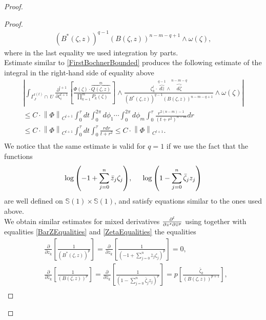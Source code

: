\documentclass[11pt,reqno]{amsart}
\numberwithin{equation}{section}
\begin{document}
\begin{proof}
\begin{proof}
\begin{multline*}
{\left(B^*(\zeta,z)\right)^{q-1}\left(B(\zeta,z)\right)^{n-m-q+1}}
\wedge\omega(\zeta),
\end{multline*}
where in the last equality we used integration by parts.\\
\indent
Estimate similar to \eqref{FirstBochnerBounded} produces the following estimate of the integral
in the right-hand side of equality above
\begin{multline*}
\left|\int_{\Gamma^{\epsilon(t)}_J\cap\ U}
\frac{\partial^{l+1}}{\partial\zeta_i^{l+1}}
\left[\frac{\Phi(\zeta)\cdot\overbrace{Q(\zeta,z)}^{m}}{\prod_{k=1}^mP_k(\zeta)}\right]
\wedge\frac{\zeta_k^l\cdot\overbrace{d{\bar z}}^{q-1}
\wedge\overbrace{d{\bar\zeta}}^{n-m-q}}
{\left(B^*(\zeta,z)\right)^{q-1}\left(B(\zeta,z)\right)^{n-m-q+1}}
\wedge\omega(\zeta)\right|\\
\leq C\cdot\left\|\Phi\right\|_{C^{l+1}}
\int_0^{\tau}dt\int_0^{2\pi} d\phi_1\cdots\int_0^{2\pi} d\phi_m
\int_0^{\tau}\frac{r^{2(n-m)-1}}{\left(t+r^2\right)^{n-m}}dr\\
\leq C\cdot\left\|\Phi\right\|_{C^{l+1}}\int_0^{\tau}dt\int_0^{\tau}\frac{rdr}{t+r^2}
\leq C\cdot\left\|\Phi\right\|_{C^{l+1}}.\\
\end{multline*}
\indent
We notice that the same estimate is valid for $q=1$ if we use the fact that the functions
$$\log{\left(-1+\sum_{j=0}^n{\bar z}_j\zeta_j\right)},\hspace{0.2in}
\log{\left(1-\sum_{j=0}^n{\bar\zeta}_jz_j\right)}$$
are well defined on ${{\mathbb S}}(1)\times{{\mathbb S}}(1)$, and satisfy equations similar to the ones used above.\\
\indent
We obtain similar estimates for mixed derivatives
${{\displaystyle} \frac{\partial^l}{\partial z^s\partial{\bar z}^p} }$ using together with equalities
\eqref{BarZEqualities} and \eqref{ZetaEqualities} the equalities
\begin{equation*}
\begin{aligned}
&\frac{\partial}{\partial z_k}
\left[\frac{1}{\left(B^*(\zeta,z)\right)^p}\right]
=\frac{\partial}{\partial z_k}
\left[\frac{1}{\left(-1+\sum_{j=0}^n{\bar z}_j\zeta_j\right)^{p}}\right]=0,\\
&\frac{\partial}{\partial z_k}
\left[\frac{1}{\left(B(\zeta,z)\right)^p}\right]
=\frac{\partial}{\partial z_k}
\left[\frac{1}{\left(1-\sum_{j=0}^n{\bar\zeta}_jz_j\right)^{p}}\right]
=p\left[\frac{{\bar\zeta}_k}{\left(B(\zeta,z)\right)^{p+1}}\right],\\
\end{aligned}

\end{equation*}
\end{proof}
\end{proof}
\end{document}
